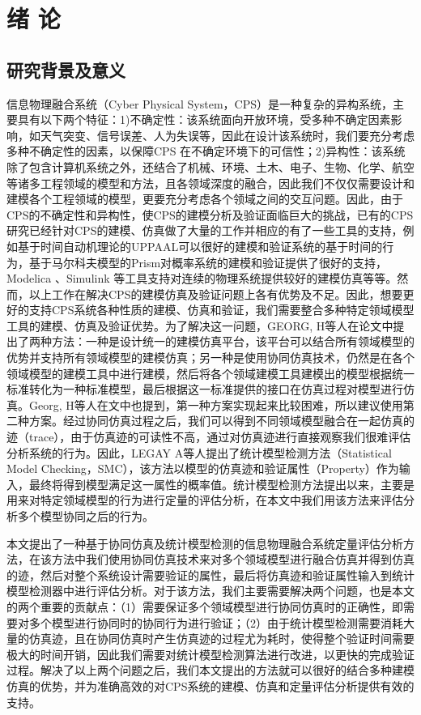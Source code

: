 \chapter{绪\hskip 0.4cm 论}
\label{ch1}

\section{研究背景及意义}
信息物理融合系统（Cyber Physical System，CPS）\cite{wangzhongjie2011cpssurvey}是一种复杂的异构系统，主要具有以下两个特征：1)不确定性：该系统面向开放环境，受多种不确定因素影响，如天气突变、信号误差、人为失误等，因此在设计该系统时，我们要充分考虑多种不确定性的因素，以保障CPS 在不确定环境下的可信性；2)异构性：该系统除了包含计算机系统之外，还结合了机械、环境、土木、电子、生物、化学、航空等诸多工程领域的模型和方法，且各领域深度的融合，因此我们不仅仅需要设计和建模各个工程领域的模型，更要充分考虑各个领域之间的交互问题。因此，由于CPS的不确定性和异构性，使CPS的建模分析及验证面临巨大的挑战，已有的CPS研究已经针对CPS的建模、仿真做了大量的工作并相应的有了一些工具的支持，例如基于时间自动机理论的UPPAAL\cite{bulychev2012uppaal}可以很好的建模和验证系统的基于时间的行为，基于马尔科夫模型的Prism\cite{kwiatkowska2011prism}对概率系统的建模和验证提供了很好的支持，Modelica \cite{Fritzson1998Modelica}、Simulink\cite{zuliani2013bayesian} 等工具支持对连续的物理系统提供较好的建模仿真等等。然而，以上工作在解决CPS的建模仿真及验证问题上各有优势及不足。因此，想要更好的支持CPS系统各种性质的建模、仿真和验证，我们需要整合多种特定领域模型工具的建模、仿真及验证优势。为了解决这一问题，GEORG, H等人在论文\cite{Georg2014Analyzing}中提出了两种方法：一种是设计统一的建模仿真平台，该平台可以结合所有领域模型的优势并支持所有领域模型的建模仿真；另一种是使用协同仿真\cite{Bastian2011Master}技术，仍然是在各个领域模型的建模工具中进行建模，然后将各个领域建模工具建模出的模型根据统一标准转化为一种标准模型，最后根据这一标准提供的接口在仿真过程对模型进行仿真。Georg, H等人在文中也提到，第一种方案实现起来比较困难，所以建议使用第二种方案。经过协同仿真过程之后，我们可以得到不同领域模型融合在一起仿真的迹（trace），由于仿真迹的可读性不高，通过对仿真迹进行直接观察我们很难评估分析系统的行为。因此，LEGAY A等人提出了统计模型检测方法（Statistical Model Checking，SMC）\cite{Legay2010Statistical}，该方法以模型的仿真迹和验证属性（Property）作为输入，最终将得到模型满足这一属性的概率值。统计模型检测方法提出以来，主要是用来对特定领域模型的行为进行定量的评估分析，在本文中我们用该方法来评估分析多个模型协同之后的行为。

本文提出了一种基于协同仿真及统计模型检测的信息物理融合系统定量评估分析方法，在该方法中我们使用协同仿真技术来对多个领域模型进行融合仿真并得到仿真的迹，然后对整个系统设计需要验证的属性，最后将仿真迹和验证属性输入到统计模型检测器中进行评估分析。对于该方法，我们主要需要解决两个问题，也是本文的两个重要的贡献点：（1）需要保证多个领域模型进行协同仿真时的正确性，即需要对多个模型进行协同时的协同行为进行验证；（2）由于统计模型检测需要消耗大量的仿真迹，且在协同仿真时产生仿真迹的过程尤为耗时，使得整个验证时间需要极大的时间开销，因此我们需要对统计模型检测算法进行改进，以更快的完成验证过程。解决了以上两个问题之后，我们本文提出的方法就可以很好的结合多种建模仿真的优势，并为准确高效的对CPS系统的建模、仿真和定量评估分析提供有效的支持。 


